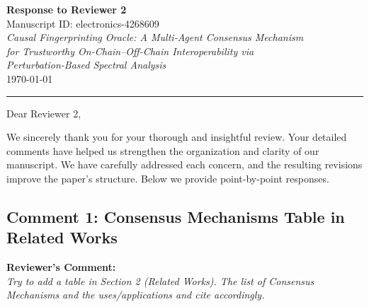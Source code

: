 \documentclass[11pt,a4paper]{article}
\newcommand{\reviewercomment}[1]{%
  \vspace{6pt}\noindent\textbf{\textcolor{reviewercolor}{Reviewer's Comment:}}\\
  \textcolor{reviewercolor}{\itshape #1}\vspace{4pt}}
\begin{document}
\begin{center}
{\LARGE\bfseries Response to Reviewer 2}\\[12pt]
{\large Manuscript ID: electronics-4268609}\\[6pt]
{\large\itshape Causal Fingerprinting Oracle: A Multi-Agent Consensus Mechanism\\
for Trustworthy On-Chain--Off-Chain Interoperability via\\
Perturbation-Based Spectral Analysis}\\[12pt]
\today
\end{center}

\noindent\rule{\textwidth}{0.4pt}

\vspace{8pt}
\noindent Dear Reviewer 2,

\vspace{4pt}
\noindent We sincerely thank you for your thorough and insightful review. Your detailed comments have helped us strengthen the organization and clarity of our manuscript. We have carefully addressed each concern, and the resulting revisions improve the paper's structure. Below we provide point-by-point responses.

\vspace{12pt}

\subsection*{Comment 1: Consensus Mechanisms Table in Related Works}

\reviewercomment{Try to add a table in Section 2 (Related Works). The list of Consensus Mechanisms and the uses/applications and cite accordingly.}
\end{document}
